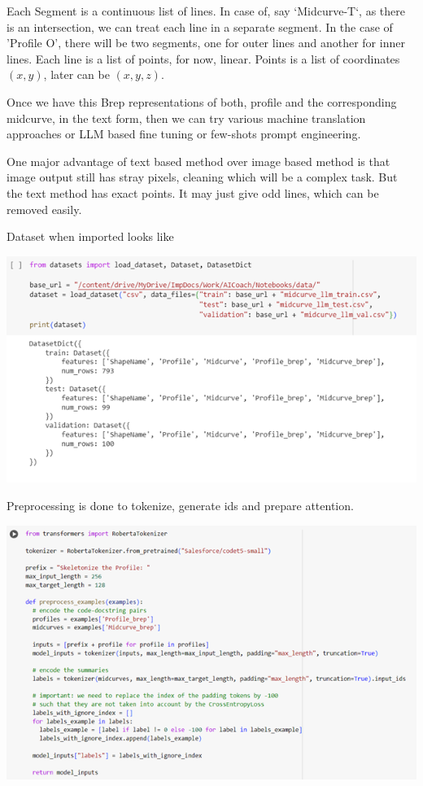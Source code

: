 \documentclass[conference]{IEEEtran}
\begin{document}
Each Segment is a continuous list of lines. In case of, say `Midcurve-T`, as there is an intersection, we can treat each line in a separate segment. In the case of 'Profile O', there will be two segments, one for outer lines and another for inner lines. Each line is a list of points, for now, linear. Points is a list of coordinates $(x,y)$, later can be $(x,y,z)$.

Once we have this Brep representations of both, profile and the corresponding midcurve, in the text form, then we can try various machine translation approaches or LLM based fine tuning or few-shots prompt engineering.

One major advantage of text based method over image based method is that image output still has stray pixels, cleaning which will be a complex task. But the text method has exact points. It may just give odd lines, which can be removed easily.

Dataset when imported looks like

         \begin{center}
	\includegraphics[width=\linewidth]{images/kaggle1}
	\label{fig_k1}
    \end{center}

Preprocessing is done to tokenize, generate ids and prepare attention.

         \begin{center}
	\includegraphics[width=\linewidth]{images/kaggle2}
	\label{fig_k2}
    \end{center}
    
\end{document}
